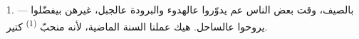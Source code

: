 %
%
%
%
%

\VUsaut{4.0mm}
\VUsaut{3.0mm}
\VUsaut{3.0mm}

1. --- بالصيف، وقت بعض الناس عم يدوّروا عالهدوء والبرودة عالجبل، غيرهن
بيفضّلوا يروحوا عالساحل. هيك عملنا السنة الماضية، لأنه منحبّ
 \textsuperscript{(1)} كتير.

